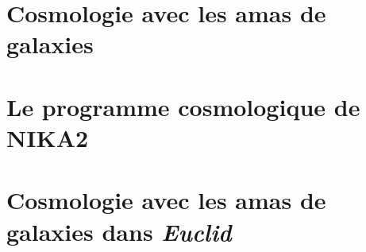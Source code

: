 \documentclass[a4paper, 12pt]{report}
\begin{document}
\chapter{Cosmologie avec les amas de galaxies}
\label{se:cosmo_general}



%
%
\chapter{Le programme cosmologique de NIKA2}
\label{se:cosmo_NIKA2}


%
%
\chapter{Cosmologie avec les amas de galaxies dans \emph{Euclid}}
\label{se:cosmo_euclid}




%


\end{document}
